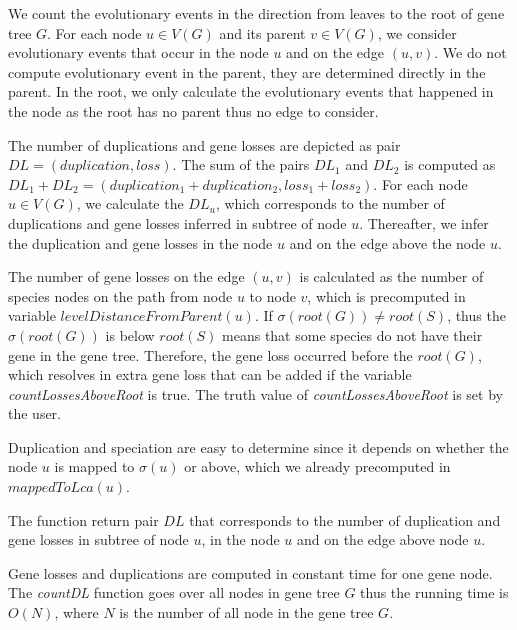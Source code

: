 We count the evolutionary events in the direction from leaves to the root of gene tree $G$. For each node $u \in V(G)$ and its parent $v \in V(G)$, we consider evolutionary events that occur in the node $u$ and on the edge $(u, v)$. We do not compute evolutionary event in the parent, they are determined directly in the parent. In the root, we only calculate the evolutionary events that happened in the node as the root has no parent thus no edge to consider.

The number of duplications and gene losses are depicted as pair $DL = (duplication, loss)$. The sum of the pairs $DL_1$  and $DL_2$ is computed as $DL_1+DL_2=(duplication_1+duplication_2, loss_1+loss_2)$. For each node $u \in V(G)$, we calculate the $DL_u$, which corresponds to the number of duplications and gene losses inferred in subtree of node $u$. Thereafter, we infer the duplication and gene losses in the node $u$ and on the edge above the node $u$.

The number of gene losses on the edge $(u, v)$ is calculated as the number of species nodes on the path from node $u$ to node $v$, which is precomputed in variable $levelDistanceFromParent(u)$. If $\sigma(root(G)) \ne root(S)$, thus the $\sigma(root(G))$ is below $root(S)$ means that some species do not have their gene in the gene tree. Therefore, the gene loss occurred before the $root(G)$, which resolves in extra gene loss that can be added if the variable \emph{countLossesAboveRoot} is true. The truth value of \emph{countLossesAboveRoot} is set by the user.

Duplication and speciation are easy to determine since it depends on whether the node $u$ is mapped to $\sigma(u)$ or above, which we already precomputed in $mappedToLca(u)$.

The function return pair $DL$ that corresponds to the number of duplication and gene losses in subtree of node $u$, in the node $u$ and on the edge above node $u$.

Gene losses and duplications are computed in constant time for one gene node. The \emph{countDL} function goes over all nodes in gene tree $G$ thus the running time is $O(N)$, where $N$ is the number of all node in the gene tree $G$.

